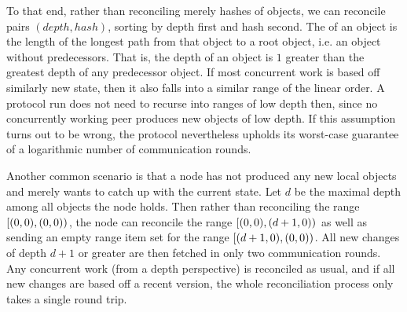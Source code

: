 To that end, rather than reconciling merely hashes of objects, we can reconcile pairs $(\mathit{depth}, \mathit{hash})$, sorting by depth first and hash second. The  of an object is the length of the longest path from that object to a root object, i.e. an object without predecessors. That is, the depth of an object is $1$ greater than the greatest depth of any predecessor object. If most concurrent work is based off similarly new state, then it also falls into a similar range of the linear order. A protocol run does not need to recurse into ranges of low depth then, since no concurrently working peer produces new objects of low depth. If this assumption turns out to be wrong, the protocol nevertheless upholds its worst-case guarantee of a logarithmic number of communication rounds.

Another common scenario is that a node has not produced any new local objects and merely wants to catch up with the current state. Let $d$ be the maximal depth among all objects the node holds. Then rather than reconciling the range $[{(0, 0)},{(0, 0)})_{}$, the node can reconcile the range $[{(0, 0)},{(d + 1, 0)})_{}$ as well as sending an empty range item set for the range $[{(d + 1, 0)},{(0, 0)})_{}$. All new changes of depth $d + 1$ or greater are then fetched in only two communication rounds. Any concurrent work (from a depth perspective) is reconciled as usual, and if all new changes are based off a recent version, the whole reconciliation process only takes a single round trip.
